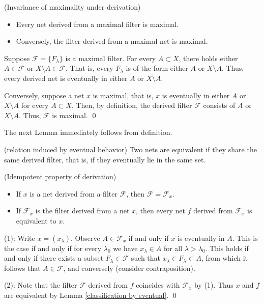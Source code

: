 \documentclass{report}
\begin{document}
\begin{exe}\label{invariance maximality} (Invariance of maximality under derivation)
    \begin{itemize}
        \item Every net derived from a maximal filter is maximal.
        \item Conversely, the filter derived from a maximal net is maximal.
    \end{itemize}
\end{exe}
\begin{prf}
    Suppose \( \mathscr{F} = \{F_{\lambda}\} \) is a maximal filter. For every \( A \subset X \), there holds either \( A \in \mathscr{F} \) or \( X \setminus A \in \mathscr{F} \). That is, every \( F_{\lambda} \) is of the form either \( A \) or \( X \setminus A \). Thus, every derived net is eventually in either \( A \) or \( X \setminus A\).

    Conversely, suppose a net \( x \) is maximal, that is, \( x \) is eventually in either \( A \) or \( X \setminus A \) for every \( A \subset X \). Then, by definition, the derived filter \( \mathscr{F} \) consists of \( A \) or \( X \setminus A \). Thus, \( \mathscr{F} \) is maximal.
    \qed\end{prf}

The next Lemma immediately follows from definition.
\begin{lem}\label{classification by eventual} (relation induced by eventual behavior)
    Two nets are equivalent if they share the same derived filter, that is, if they eventually lie in the same set.
\end{lem}

\begin{lem}\label{reflexive property} (Idempotent property of derivation)
    \begin{itemize}
        \item[(1)] If \( x \) is a net derived from a filter \( \mathscr{F} \), then \( \mathscr{F} = \mathscr{F}_x \).
        \item[(2)] If \( \mathscr{F}_x \) is the filter derived from a net \( x \),
            then every net \( f \) derived from \( \mathscr{F}_x \) is equivalent to \( x \).
    \end{itemize}
\end{lem}
\begin{prf}
    (1): Write \( x = (x_{\lambda}) \). Observe \( A \in \mathscr{F}_x \) if and only if \( x \) is eventually in \( A \).
    This is the case if and only if for every \( \lambda_0 \) we have \( x_{\lambda} \in A \) for all \( \lambda > \lambda_0 \).
    This holds if and only if there exists a subset \( F_{\lambda}\in \mathscr{F} \) such that \( x_{\lambda} \in F_{\lambda} \subset A \), from which it follows that \( A \in \mathscr{F} \), and conversely (consider contraposition).

    (2): Note that the filter \( \mathscr{F} \) derived from \( f \) coincides with \( \mathscr{F}_x \) by (1). Thus \( x \) and \( f \) are equivalent by Lemma \ref{classification by eventual}.
    \qed\end{prf}
\end{document}
